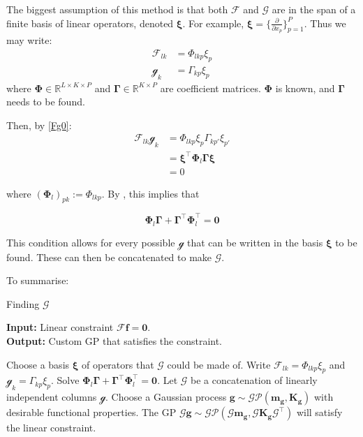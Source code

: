 \documentclass[12pt,a4paper,twoside]{report}
\theoremstyle{definition}
\begin{document}
The biggest assumption of this method is that both $\mathscr{F}$ and $\mathscr G$ are in the span of a finite basis of linear operators, denoted $\boldsymbol \xi$. For example, $\boldsymbol \xi = \{\frac{\partial}{\partial x_p}\}_{p=1}^P$. Thus we may write:
\begin{align*}
	\mathscr F_{lk} &= \Phi_{lkp} \xi_p\\
	\mathscr g_k &= \Gamma_{kp} \xi_{p}
\end{align*}
where $\boldsymbol \Phi \in \mathbb{R}^{L\times K\times P}$ and $\boldsymbol \Gamma \in \mathbb{R}^{K\times P}$ are coefficient matrices. $\boldsymbol \Phi$ is known, and $\boldsymbol \Gamma$ needs to be found.

Then, by \cref{Fg0}:
\begin{align*}
	\mathscr F_{lk}\mathscr g_k &= \Phi_{lkp}\xi_p\Gamma_{kp'}\xi_{p'}\\
	&= \boldsymbol \xi^\top \boldsymbol \Phi_l \boldsymbol \Gamma \boldsymbol \xi\\
	&= 0
\end{align*}

where $(\boldsymbol \Phi_l)_{pk}:=\Phi_{lkp}$. By , this implies that

$$\boldsymbol \Phi_l \boldsymbol \Gamma + \boldsymbol \Gamma^\top \boldsymbol \Phi_l^\top=\mathbf 0$$

This condition allows for every possible $\mathscr g$ that can be written in the basis $\boldsymbol \xi$ to be found. These can then be concatenated to make $\mathscr G$. 

To summarise:

\begin{algorithm}
\caption{Finding $\mathscr G$}\label{findingGalg}
	 \hspace*{\algorithmicindent} \textbf{Input:} Linear constraint $\mathscr F \mathbf f = \mathbf 0$. \\
	 \hspace*{\algorithmicindent} \textbf{Output:} Custom GP that satisfies the constraint. 
\begin{algorithmic}[1]
	\State Choose a basis $\boldsymbol \xi$ of operators that $\mathscr G$ could be made of.
	\State Write $\mathscr F_{lk} = \Phi_{lkp}\xi_p$ and $\mathscr g_k = \Gamma_{kp} \xi_p$.
	\State Solve $\boldsymbol \Phi_l \boldsymbol \Gamma + \boldsymbol \Gamma^\top \boldsymbol \Phi_l^\top=\mathbf 0$.
	\State Let $\mathscr G$ be a concatenation of linearly independent columns $\mathscr g$.
	\State Choose a Gaussian process $\mathbf g\sim \mathcal{GP}(\mathbf m_\mathbf g, \mathbf K_\mathbf g)$ with desirable functional properties.
	\State The GP $\mathscr G\mathbf g\sim \mathcal {GP}(\mathscr G\mathbf m_\mathbf g, \mathscr G \mathbf K_\mathbf g \mathscr G^\top)$ will satisfy the linear constraint.
\end{algorithmic}
\end{algorithm}
\end{document}
